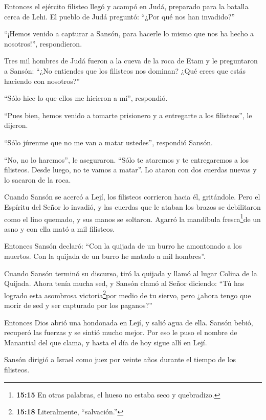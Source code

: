  Entonces el ejército filisteo llegó y acampó en Judá,
preparado para la batalla cerca de Lehi.  El pueblo de Judá
preguntó: ``¿Por qué nos han invadido?''

``¡Hemos venido a capturar a Sansón, para hacerle lo mismo que nos ha
hecho a nosotros!'', respondieron.

 Tres mil hombres de Judá fueron a la cueva de la roca de
Etam y le preguntaron a Sansón: ``¿No entiendes que los filisteos nos
dominan? ¿Qué crees que estás haciendo con nosotros?''

``Sólo hice lo que ellos me hicieron a mí'', respondió.

 ``Pues bien, hemos venido a tomarte prisionero y a
entregarte a los filisteos'', le dijeron.

``Sólo júrenme que no me van a matar ustedes'', respondió Sansón.

 ``No, no lo haremos'', le aseguraron. ``Sólo te ataremos y
te entregaremos a los filisteos. Desde luego, no te vamos a matar''. Lo
ataron con dos cuerdas nuevas y lo sacaron de la roca.

 Cuando Sansón se acercó a Lejí, los filisteos corrieron
hacia él, gritándole. Pero el Espíritu del Señor lo invadió, y las
cuerdas que le ataban los brazos se debilitaron como el lino quemado, y
sus manos se soltaron.  Agarró la mandíbula
fresca\footnote{\textbf{15:15} En otras palabras, el hueso no estaba
  seco y quebradizo.}de un asno y con ella mató a mil filisteos.

 Entonces Sansón declaró: ``Con la quijada de un burro he
amontonado a los muertos. Con la quijada de un burro he matado a mil
hombres''.

 Cuando Sansón terminó su discurso, tiró la quijada y llamó
al lugar Colina de la Quijada.  Ahora tenía mucha sed, y
Sansón clamó al Señor diciendo: ``Tú has logrado esta asombrosa
victoria\footnote{\textbf{15:18} Literalmente, ``salvación.''}por medio
de tu siervo, pero ¿ahora tengo que morir de sed y ser capturado por los
paganos?''

 Entonces Dios abrió una hondonada en Lejí, y salió agua de
ella. Sansón bebió, recuperó las fuerzas y se sintió mucho mejor. Por
eso le puso el nombre de Manantial del que clama, y hasta el día de hoy
sigue allí en Lejí.

 Sansón dirigió a Israel como juez por veinte años durante
el tiempo de los filisteos.

